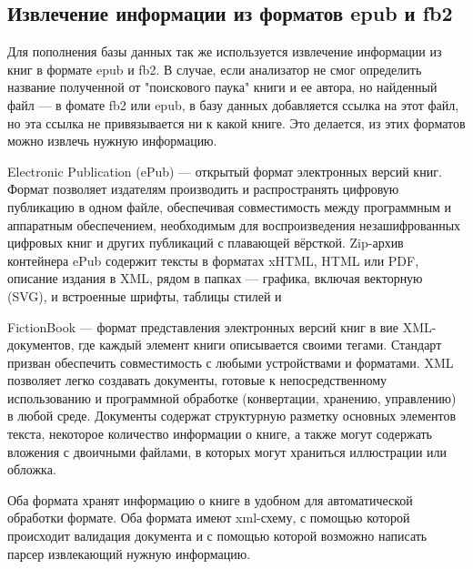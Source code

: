 \subsection{Извлечение информации из форматов epub и fb2}

Для пополнения базы данных так же используется извлечение информации из книг в формате epub и fb2. В случае, если анализатор не смог определить название полученной от "поискового паука" книги и ее автора, но найденный файл --- в фомате fb2 или epub, в базу данных добавляется ссылка на этот файл, но эта ссылка не привязывается ни к какой книге. Это делается, \tk из этих форматов можно извлечь нужную информацию. 

Electronic Publication (ePub) \cite{epub} — открытый формат электронных версий книг. Формат позволяет издателям производить и распространять цифровую публикацию в одном файле, обеспечивая совместимость между программным и аппаратным обеспечением, необходимым для воспроизведения незашифрованных цифровых книг и других публикаций с плавающей вёрсткой.
Zip-архив контейнера ePub содержит тексты в форматах xHTML, HTML или PDF, описание издания в XML, рядом в папках — графика, включая векторную (SVG), и встроенные шрифты, таблицы стилей и \td 

FictionBook \cite{fb2} — формат представления электронных версий книг в вие XML-документов, где каждый элемент книги описывается своими тегами. Стандарт призван обеспечить совместимость с любыми устройствами и форматами. XML позволяет легко создавать документы, готовые к непосредственному использованию и программной обработке (конвертации, хранению, управлению) в любой среде. Документы содержат структурную разметку основных элементов текста, некоторое количество информации о книге, а также могут содержать вложения с двоичными файлами, в которых могут храниться иллюстрации или обложка.

Оба формата хранят информацию о книге в удобном для автоматической обработки формате. Оба формата имеют xml-схему, с помощью которой происходит валидация документа и с помощью которой возможно написать парсер извлекающий нужную информацию.
